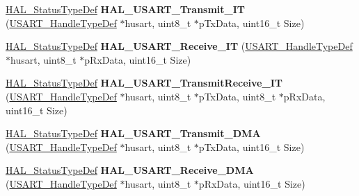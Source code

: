 \begin{DoxyCompactItemize}
\item 
\hyperlink{stm32f4xx__hal__def_8h_a63c0679d1cb8b8c684fbb0632743478f}{H\+A\+L\+\_\+\+Status\+Type\+Def} {\bfseries H\+A\+L\+\_\+\+U\+S\+A\+R\+T\+\_\+\+Transmit\+\_\+\+IT} (\hyperlink{struct_u_s_a_r_t___handle_type_def}{U\+S\+A\+R\+T\+\_\+\+Handle\+Type\+Def} $\ast$husart, uint8\+\_\+t $\ast$p\+Tx\+Data, uint16\+\_\+t Size)\hypertarget{group___u_s_a_r_t___exported___functions___group2_gaee43a3d0faab6467aea5663f8b0e87b0}{}\label{group___u_s_a_r_t___exported___functions___group2_gaee43a3d0faab6467aea5663f8b0e87b0}

\item 
\hyperlink{stm32f4xx__hal__def_8h_a63c0679d1cb8b8c684fbb0632743478f}{H\+A\+L\+\_\+\+Status\+Type\+Def} {\bfseries H\+A\+L\+\_\+\+U\+S\+A\+R\+T\+\_\+\+Receive\+\_\+\+IT} (\hyperlink{struct_u_s_a_r_t___handle_type_def}{U\+S\+A\+R\+T\+\_\+\+Handle\+Type\+Def} $\ast$husart, uint8\+\_\+t $\ast$p\+Rx\+Data, uint16\+\_\+t Size)\hypertarget{group___u_s_a_r_t___exported___functions___group2_ga19816dd7809a5dba59f309172cb7ea2d}{}\label{group___u_s_a_r_t___exported___functions___group2_ga19816dd7809a5dba59f309172cb7ea2d}

\item 
\hyperlink{stm32f4xx__hal__def_8h_a63c0679d1cb8b8c684fbb0632743478f}{H\+A\+L\+\_\+\+Status\+Type\+Def} {\bfseries H\+A\+L\+\_\+\+U\+S\+A\+R\+T\+\_\+\+Transmit\+Receive\+\_\+\+IT} (\hyperlink{struct_u_s_a_r_t___handle_type_def}{U\+S\+A\+R\+T\+\_\+\+Handle\+Type\+Def} $\ast$husart, uint8\+\_\+t $\ast$p\+Tx\+Data, uint8\+\_\+t $\ast$p\+Rx\+Data, uint16\+\_\+t Size)\hypertarget{group___u_s_a_r_t___exported___functions___group2_gaf67f2b883594afd0027f10a518a3f595}{}\label{group___u_s_a_r_t___exported___functions___group2_gaf67f2b883594afd0027f10a518a3f595}

\item 
\hyperlink{stm32f4xx__hal__def_8h_a63c0679d1cb8b8c684fbb0632743478f}{H\+A\+L\+\_\+\+Status\+Type\+Def} {\bfseries H\+A\+L\+\_\+\+U\+S\+A\+R\+T\+\_\+\+Transmit\+\_\+\+D\+MA} (\hyperlink{struct_u_s_a_r_t___handle_type_def}{U\+S\+A\+R\+T\+\_\+\+Handle\+Type\+Def} $\ast$husart, uint8\+\_\+t $\ast$p\+Tx\+Data, uint16\+\_\+t Size)\hypertarget{group___u_s_a_r_t___exported___functions___group2_ga3d52e7ec93f6111e87c11daa8c00d1a1}{}\label{group___u_s_a_r_t___exported___functions___group2_ga3d52e7ec93f6111e87c11daa8c00d1a1}

\item 
\hyperlink{stm32f4xx__hal__def_8h_a63c0679d1cb8b8c684fbb0632743478f}{H\+A\+L\+\_\+\+Status\+Type\+Def} {\bfseries H\+A\+L\+\_\+\+U\+S\+A\+R\+T\+\_\+\+Receive\+\_\+\+D\+MA} (\hyperlink{struct_u_s_a_r_t___handle_type_def}{U\+S\+A\+R\+T\+\_\+\+Handle\+Type\+Def} $\ast$husart, uint8\+\_\+t $\ast$p\+Rx\+Data, uint16\+\_\+t Size)\hypertarget{group___u_s_a_r_t___exported___functions___group2_gab0322771e1ddbb8c2ac6dd75e7e1c90e}{}\label{group___u_s_a_r_t___exported___functions___group2_gab0322771e1ddbb8c2ac6dd75e7e1c90e}


\end{DoxyCompactItemize}
